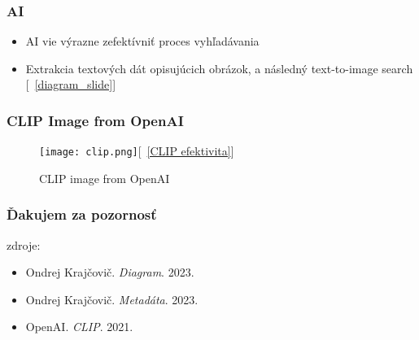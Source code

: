 \documentclass{beamer}
\begin{document}
\begin{frame}
  \frametitle{AI}
     \begin{itemize}
     \item AI vie výrazne zefektívniť proces vyhľadávania
     \item Extrakcia textových dát opisujúcich obrázok, a následný text-to-image search [~\ref{diagram_slide}]
   \end{itemize}
\end{frame}

\begin{frame}
  \frametitle{CLIP Image from OpenAI}
  \begin{figure}
    \texttt{[image: clip.png]}[~\ref{CLIP efektivita}]
    \caption{CLIP image from OpenAI}
  \end{figure}
\end{frame}



\begin{frame}
  \frametitle{Ďakujem za pozornosť}
  zdroje:
  \begin{itemize}
    \item Ondrej Krajčovič. \textit{Diagram}. 2023. \label{diagram}
    \item Ondrej Krajčovič. \textit{Metadáta}. 2023. \label{metadata}
    \item OpenAI. \textit{CLIP}. 2021. \label{CLIP efektivita}
  \end{itemize}
\end{frame}
\end{document}
